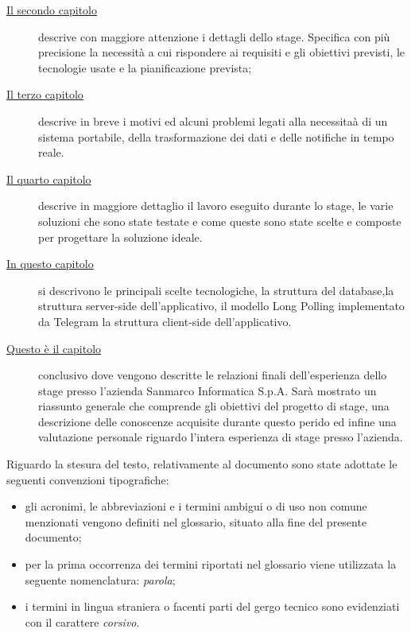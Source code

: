 \begin{description}
    \item[{\hyperref[cap:processi-metodologie]{Il secondo capitolo}}] descrive con maggiore attenzione i dettagli dello stage. Specifica con più precisione la necessità a cui rispondere ai requisiti e gli obiettivi previsti, le tecnologie usate e la pianificazione prevista;
    
    \item[{\hyperref[cap:definizione-problema]{Il terzo capitolo}}] descrive in breve i motivi ed alcuni problemi legati alla necessitaà di un sistema portabile, della trasformazione dei dati e delle notifiche in tempo reale.
    
    \item[{\hyperref[cap:analisi-requisiti]{Il quarto capitolo}}] descrive in maggiore dettaglio il lavoro eseguito durante lo stage, le varie soluzioni che sono state testate e come queste sono state scelte e composte per progettare la soluzione ideale.
    
    \item[{\hyperref[cap:progettazione-codifica]{In questo capitolo}}] si descrivono le principali scelte tecnologiche, la struttura del database,la struttura server-side dell'applicativo, il modello Long Polling implementato da Telegram la struttura client-side dell'applicativo.
    
    \item[{\hyperref[cap:conclusioni]{Questo è il capitolo}}] conclusivo dove vengono descritte le relazioni finali dell'esperienza dello stage presso l'azienda Sanmarco Informatica S.p.A. Sarà mostrato un riassunto generale che comprende gli obiettivi del progetto di stage, una descrizione delle conoscenze acquisite durante questo perido ed infine una valutazione personale riguardo l'intera esperienza di stage presso l'azienda. 
\end{description}

Riguardo la stesura del testo, relativamente al documento sono state adottate le seguenti convenzioni tipografiche:
\begin{itemize}
	\item gli acronimi, le abbreviazioni e i termini ambigui o di uso non comune menzionati vengono definiti nel glossario, situato alla fine del presente documento;
	\item per la prima occorrenza dei termini riportati nel glossario viene utilizzata la seguente nomenclatura: \emph{parola}\glsfirstoccur;
	\item i termini in lingua straniera o facenti parti del gergo tecnico sono evidenziati con il carattere \emph{corsivo}.
\end{itemize}